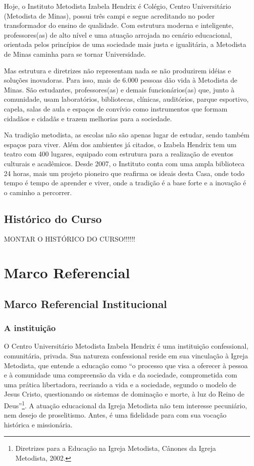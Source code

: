 \documentclass[a4paper, 12pt, openright, oneside, german, french, english, brazil]{abntex2}
\begin{document}
Hoje, o Instituto Metodista Izabela Hendrix é Colégio, Centro Universitário (Metodista de Minas), possui três campi e segue acreditando no poder transformador do ensino de qualidade. Com estrutura moderna e inteligente, professores(as) de alto nível e uma atuação arrojada no cenário educacional, orientada pelos princípios de uma sociedade mais justa e igualitária, a Metodista de Minas caminha para se tornar Universidade.

Mas estrutura e diretrizes não representam nada se não produzirem idéias e soluções inovadoras. Para isso, mais de 6.000 pessoas dão vida à Metodista de Minas. São estudantes, professores(as) e demais funcionários(as) que, junto à comunidade, usam laboratórios, bibliotecas, clínicas, auditórios, parque esportivo, capela, salas de aula e espaços de convívio como instrumentos que formam cidadãos e cidadãs e trazem melhorias para a sociedade.

Na tradição metodista, as escolas não são apenas lugar de estudar, sendo também espaços para viver. Além dos ambientes já citados, o Izabela Hendrix tem um teatro com 400 lugares, equipado com estrutura para a realização de eventos culturais e acadêmicos. Desde 2007, o Instituto conta com uma ampla biblioteca 24 horas, mais um projeto pioneiro que reafirma os ideais desta Casa, onde todo tempo é tempo de aprender e viver, onde a tradição é a base forte e a inovação é o caminho a percorrer.

\section{Histórico do Curso}

MONTAR O HISTÓRICO DO CURSO!!!!!!


\chapter{Marco Referencial}

\section{Marco Referencial Institucional}

\subsection{A instituição}

O Centro Universitário Metodista Izabela Hendrix é uma instituição confessional, comunitária, privada. Sua natureza confessional reside em sua vinculação à Igreja Metodista, que entende a educação como ``o processo que visa a oferecer à pessoa e à comunidade uma compreensão da vida e da sociedade, comprometida com uma prática libertadora, recriando a vida e a sociedade, segundo o modelo de Jesus Cristo, questionando os sistemas de dominação e morte, à luz do Reino de Deus''\footnote{Diretrizes para a Educação na Igreja Metodista, Cânones da Igreja Metodista, 2002.}. A atuação educacional da Igreja Metodista não tem interesse pecuniário, nem desejo de proselitismo. Antes, é uma fidelidade para com sua vocação histórica e missionária.
\end{document}
